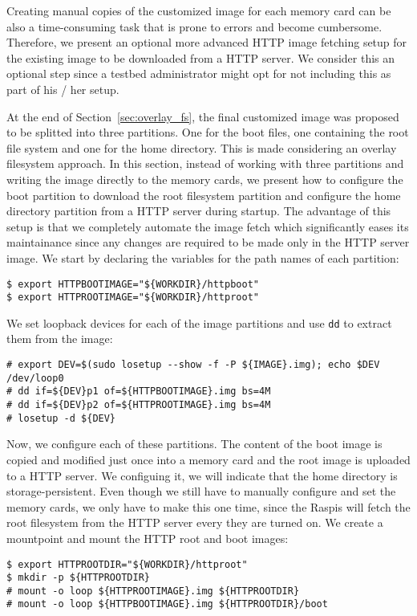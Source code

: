 \label{sec:testbed_http}
Creating manual copies of the customized image for each memory card can
be also a time-consuming task that is prone to errors and become
cumbersome. Therefore, we present an optional more advanced \ac{HTTP}
image fetching setup for the existing image to be downloaded from a
\ac{HTTP} server. We consider this an optional step since a testbed
administrator might opt for not including this as part of his / her setup.

At the end of Section~\ref{sec:overlay_fs}, the final customized image was
proposed to be splitted into three partitions. One for the boot files, one
containing the root file system and one for the home directory. This is made
considering an overlay filesystem approach. In this section, instead of
working with three partitions and writing the image directly to the memory
cards, we present how to configure the boot partition to download the root
filesystem partition and configure the home directory partition
from a \ac{HTTP} server during startup. The advantage of this setup is that
we completely automate the image fetch which significantly eases its
maintainance since any changes are required to be made only in the \ac{HTTP}
server image. We start by declaring the variables for the path names of each
partition:

\begin{lstlisting}[]
$ export HTTPBOOTIMAGE="${WORKDIR}/httpboot"
$ export HTTPROOTIMAGE="${WORKDIR}/httproot"
\end{lstlisting}
\FloatBarrier
\vspace{-5mm}

We set loopback devices for each of the image partitions and use \texttt{dd} to
extract them from the image:
\begin{lstlisting}[]
# export DEV=$(sudo losetup --show -f -P ${IMAGE}.img); echo $DEV
/dev/loop0
# dd if=${DEV}p1 of=${HTTPBOOTIMAGE}.img bs=4M
# dd if=${DEV}p2 of=${HTTPROOTIMAGE}.img bs=4M
# losetup -d ${DEV}
\end{lstlisting}
\FloatBarrier
\vspace{-5mm}

Now, we configure each of these partitions. The content of the boot image is
copied and modified just once into a memory card and the root
image is uploaded to a \ac{HTTP} server. We configuing it, we will indicate
that the home directory is storage-persistent. Even though we still
have to manually configure and set the memory cards, we only have
to make this one time, since the \ac{Raspi}s will fetch the root filesystem
from the \ac{HTTP} server every they are turned on. We create a mountpoint
and mount the \ac{HTTP} root and boot images:
\begin{lstlisting}[]
$ export HTTPROOTDIR="${WORKDIR}/httproot"
$ mkdir -p ${HTTPROOTDIR}
# mount -o loop ${HTTPROOTIMAGE}.img ${HTTPROOTDIR}
# mount -o loop ${HTTPBOOTIMAGE}.img ${HTTPROOTDIR}/boot
\end{lstlisting}
\FloatBarrier
\vspace{-5mm}

